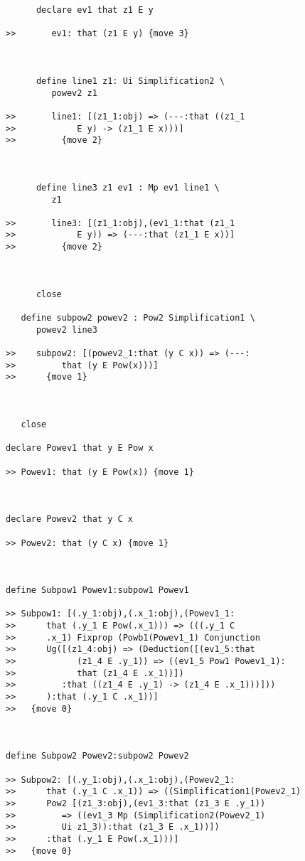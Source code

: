 \documentclass{article}
\begin{document}
\begin{verbatim}
      declare ev1 that z1 E y

>>       ev1: that (z1 E y) {move 3}



      define line1 z1: Ui Simplification2 \
         powev2 z1

>>       line1: [(z1_1:obj) => (---:that ((z1_1
>>            E y) -> (z1_1 E x)))]
>>         {move 2}



      define line3 z1 ev1 : Mp ev1 line1 \
         z1

>>       line3: [(z1_1:obj),(ev1_1:that (z1_1
>>            E y)) => (---:that (z1_1 E x))]
>>         {move 2}



      close

   define subpow2 powev2 : Pow2 Simplification1 \
      powev2 line3

>>    subpow2: [(powev2_1:that (y C x)) => (---:
>>         that (y E Pow(x)))]
>>      {move 1}



   close

declare Powev1 that y E Pow x

>> Powev1: that (y E Pow(x)) {move 1}



declare Powev2 that y C x

>> Powev2: that (y C x) {move 1}



define Subpow1 Powev1:subpow1 Powev1

>> Subpow1: [(.y_1:obj),(.x_1:obj),(Powev1_1:
>>      that (.y_1 E Pow(.x_1))) => (((.y_1 C
>>      .x_1) Fixprop (Powb1(Powev1_1) Conjunction
>>      Ug([(z1_4:obj) => (Deduction([(ev1_5:that
>>            (z1_4 E .y_1)) => ((ev1_5 Pow1 Powev1_1):
>>            that (z1_4 E .x_1))])
>>         :that ((z1_4 E .y_1) -> (z1_4 E .x_1)))]))
>>      ):that (.y_1 C .x_1))]
>>   {move 0}



define Subpow2 Powev2:subpow2 Powev2

>> Subpow2: [(.y_1:obj),(.x_1:obj),(Powev2_1:
>>      that (.y_1 C .x_1)) => ((Simplification1(Powev2_1)
>>      Pow2 [(z1_3:obj),(ev1_3:that (z1_3 E .y_1))
>>         => ((ev1_3 Mp (Simplification2(Powev2_1)
>>         Ui z1_3)):that (z1_3 E .x_1))])
>>      :that (.y_1 E Pow(.x_1)))]
>>   {move 0}


\end{verbatim}
\end{document}
